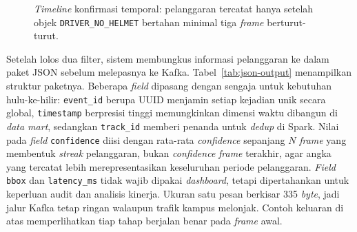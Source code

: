 \begin{figure}[htbp]
\centering
{}
\caption{\textit{Timeline} konfirmasi temporal: pelanggaran tercatat hanya setelah objek \texttt{DRIVER\_NO\_HELMET} bertahan minimal tiga \textit{frame} berturut-turut.}
\label{fig:streak-timeline}
\end{figure}

Setelah lolos dua filter, sistem membungkus informasi pelanggaran ke dalam paket JSON sebelum melepasnya ke Kafka. Tabel~\ref{tab:json-output} menampilkan struktur paketnya. Beberapa \textit{field} dipasang dengan sengaja untuk kebutuhan hulu-ke-hilir: \texttt{event\_id} berupa UUID menjamin setiap kejadian unik secara global, \texttt{timestamp} berpresisi tinggi memungkinkan dimensi waktu dibangun di \textit{data mart}, sedangkan \texttt{track\_id} memberi penanda untuk \textit{dedup} di Spark. Nilai pada \textit{field} \texttt{confidence} diisi dengan rata-rata \textit{confidence} sepanjang $N$ \textit{frame} yang membentuk \textit{streak} pelanggaran, bukan \textit{confidence} \textit{frame} terakhir, agar angka yang tercatat lebih merepresentasikan keseluruhan periode pelanggaran. \textit{Field} \texttt{bbox} dan \texttt{latency\_ms} tidak wajib dipakai \textit{dashboard}, tetapi dipertahankan untuk keperluan audit dan analisis kinerja. Ukuran satu pesan berkisar 335 \textit{byte}, jadi jalur Kafka tetap ringan walaupun trafik kampus melonjak. Contoh keluaran di atas memperlihatkan tiap tahap berjalan benar pada \textit{frame} awal.

